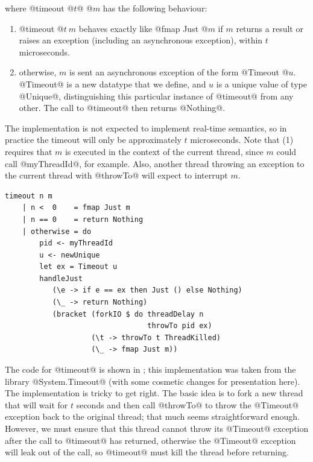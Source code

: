 \noindent where @timeout @$t$@ @$m$ has the following behaviour:

\begin{enumerate}
\item @timeout @$t~m$ behaves exactly like @fmap Just @$m$ if $m$ returns a
  result or raises an exception (including an asynchronous exception),
  within $t$ microseconds.
\item otherwise, $m$ is sent an asynchronous exception of the form
  @Timeout @$u$.  @Timeout@ is a new datatype that we define, and $u$
  is a unique value of type @Unique@, distinguishing this particular
  instance of @timeout@ from any other.  The call to @timeout@ then
  returns @Nothing@.
\end{enumerate}

The implementation is not expected to implement real-time semantics,
so in practice the timeout will only be approximately $t$ microseconds.
Note that (1) requires that $m$ is executed in the context of the
current thread, since $m$ could call @myThreadId@, for example.  Also,
another thread throwing an exception to the current thread with
@throwTo@ will expect to interrupt $m$.

\begin{lstlisting}[float,label=lst:timeout,caption=implementation of \texttt{timeout},language=HaskellUlisses,style=numbers]
timeout n m
    | n <  0    = fmap Just m
    | n == 0    = return Nothing
    | otherwise = do
        pid <- myThreadId
        u <- newUnique
        let ex = Timeout u
        handleJust
           (\e -> if e == ex then Just () else Nothing)
           (\_ -> return Nothing)
           (bracket (forkIO $ do threadDelay n
                                 throwTo pid ex)
                    (\t -> throwTo t ThreadKilled)
                    (\_ -> fmap Just m))
\end{lstlisting}

The code for @timeout@ is shown in ; this
implementation was taken from the library @System.Timeout@ (with some
cosmetic changes for presentation here).  The implementation is tricky
to get right.  The basic idea is to fork a new thread that will wait
for $t$ seconds and then call @throwTo@ to throw the @Timeout@
exception back to the original thread; that much seems straightforward
enough.  However, we must ensure that this thread cannot throw its
@Timeout@ exception after the call to @timeout@ has returned,
otherwise the @Timeout@ exception will leak out of the call, so
@timeout@ must kill the thread before returning.


